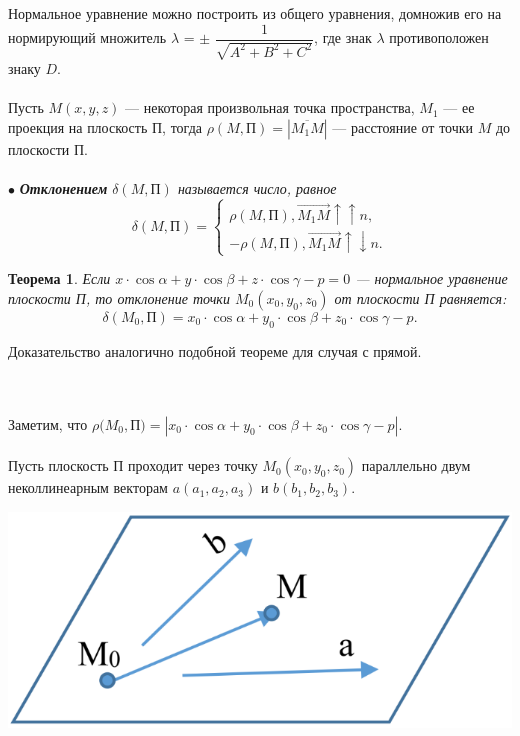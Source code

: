 Нормальное уравнение можно построить из общего уравнения, домножив его на нормирующий множитель
$\lambda$ = $\pm$ $\dfrac{1}{\sqrt{A^2 + B^2 + C^2}}$, где знак $\lambda$ противоположен знаку $D$.\\\\
Пусть $M(x, y, z)$ --- некоторая произвольная точка пространства, $M_1$ --- ее проекция на плоскость П,  тогда $\rho(M, \text{П}) = | \overline{M_1 M} |$ --- расстояние от точки $M$ до плоскости П. \\\\
$\bullet$ \textit{\textbf{Отклонением} $\delta(M, \text{П})$ называется число, равное}
$$\delta(M, \text{П}) = \begin{cases} \rho(M, \text{П}), \overrightarrow{M_1 M} \uparrow\uparrow n, \\ -\rho(M, \text{П}), \overrightarrow{M_1 M} \uparrow\downarrow n. \end{cases}$$
\newtheorem*{t5_1_3}{Теорема} \begin{t5_1_3} Если $x\cdot \cos\alpha + y\cdot \cos\beta + z\cdot \cos\gamma - p = 0$ --- нормальное уравнение плоскости П, то отклонение точки $M_0(x_0, y_0, z_0)$ от плоскости П равняется:$$\delta(M_0, \text{П}) = x_0 \cdot \cos \alpha  +  y_0 \cdot \cos \beta  +  z_0 \cdot \cos \gamma  -  p.$$\end{t5_1_3}\begin{Proof}
	Доказательство аналогично подобной теореме для случая с прямой.
\end{Proof}\\\\
Заметим, что $\rho(M_0, $П$) = |x_0\cdot \cos\alpha + y_0 \cdot \cos\beta + z_0\cdot \cos\gamma - p|$.\\\\
Пусть плоскость П проходит через точку $M_0(x_0, y_0, z_0)$ параллельно двум неколлинеарным векторам $a(a_1, a_2, a_3)$ и $b(b_1, b_2, b_3)$. \begin{center}
	\includegraphics[scale=0.35]{images/pl3_4_1.png}
\end{center}
